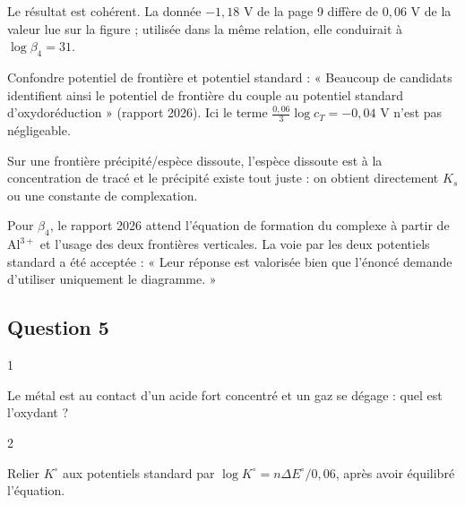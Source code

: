 \documentclass[11pt,a4paper]{article}
\begin{document}
Le résultat est cohérent. La donnée \(-1{,}18\) V de la page 9 diffère de \(0{,}06\) V de la valeur lue sur la figure ; utilisée dans la même relation, elle conduirait à \(\log\beta_4=31\).

\begin{piege}

Confondre potentiel de frontière et potentiel standard : « Beaucoup de candidats identifient ainsi le potentiel de frontière du couple au potentiel standard d'oxydoréduction » (rapport 2026). Ici le terme \(\frac{0{,}06}{3}\log c_T=-0{,}04\) V n'est pas négligeable.

\end{piege}

\begin{methode}

Sur une frontière précipité/espèce dissoute, l'espèce dissoute est à la concentration de tracé et le précipité existe tout juste : on obtient directement \(K_s\) ou une constante de complexation.

\end{methode}

\begin{jury}

Pour \(\beta_4\), le rapport 2026 attend l'équation de formation du complexe à partir de \(\mathrm{Al^{3+}}\) et l'usage des deux frontières verticales. La voie par les deux potentiels standard a été acceptée : « Leur réponse est valorisée bien que l'énoncé demande d'utiliser uniquement le diagramme. »

\end{jury}

\hypertarget{question-5}{%
\subsection{Question 5}\label{question-5}}

\begin{indication}{1}

Le métal est au contact d'un acide fort concentré et un gaz se dégage : quel est l'oxydant ?

\end{indication}

\begin{indication}{2}

Relier \(K^\circ\) aux potentiels standard par \(\log K^\circ=n\Delta E^\circ/0{,}06\), après avoir équilibré l'équation.

\end{indication}
\end{document}
